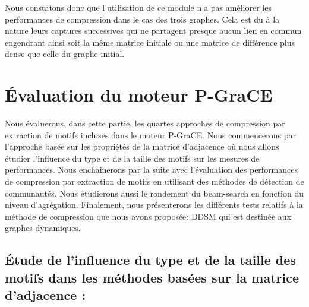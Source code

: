 Nous constatons donc que l'utilisation de ce module n'a pas améliorer les performances de compression dans le cas des trois graphes. Cela est du à la nature leurs captures successives qui ne partagent presque aucun lien en commun engendrant ainsi soit la même matrice initiale ou une matrice de différence plus dense que celle du graphe initial.



	\section{Évaluation du moteur P-GraCE}
	
	Nous évaluerons, dans cette partie, les quartes approches de compression par extraction de motifs incluses dans le moteur P-GraCE. Nous commencerons par l'approche basée sur les propriétés de la matrice d'adjacence où nous allons étudier l'influence du type et de la taille des motifs sur les mesures de performances.  Nous enchainerons par la suite avec l'évaluation des performances de compression par extraction de motifs en utilisant des méthodes de détection de communautés. Nous étudierons aussi le rondement du beam-search en fonction du niveau d'agrégation. Finalement, nous présenterons les différents tests relatifs à la méthode de compression que nous avons proposée: DDSM qui est destinée aux graphes dynamiques.
	
	\subsection{Étude de l'influence du type et de la taille des motifs dans les méthodes basées sur la matrice d'adjacence :}
	
